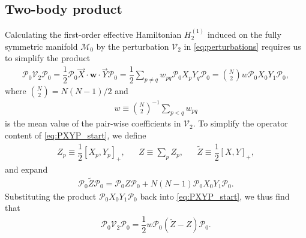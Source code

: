\documentclass[nofootinbib,notitlepage,11pt]{revtex4-2}
\newcommand{\f}[2]{\dfrac{#1}{#2}} %
\newcommand{\p}[1]{\left(#1\right)} %
\renewcommand{\sp}[1]{\left[#1\right]} %
\renewcommand{\c}{\cdot} %
\newcommand{\m}{\bm} %
\renewcommand{\v}{\vec} %
\newcommand{\1}{\mathds{1}}
\newcommand{\M}{\mathcal{M}}
\renewcommand{\P}{\mathcal{P}}
\newcommand{\V}{\mathcal{V}}
\begin{document}
\subsection{Two-body product}
\label{sec:PXYP}

Calculating the first-order effective Hamiltonian $H_2^{(1)}$ induced
on the fully symmetric manifold $\M_0$ by the perturbation $\V_2$ in
\eqref{eq:perturbations} requires us to simplify the product
\begin{align}
  \P_0 \V_2 \P_0
  = \f12 \P_0 \v X\c\m w\c\v Y\P_0
  = \f12 \sum_{p\ne q} w_{pq} \P_0 X_p Y_q \P_0
  = {N\choose 2} w \P_0 X_0 Y_1 \P_0,
  \label{eq:PXYP_start}
\end{align}
where ${N\choose2}=N\p{N-1}/2$ and
\begin{align}
  w \equiv {N\choose 2}^{-1} \sum_{p<q} w_{pq}
\end{align}
is the mean value of the pair-wise coefficients in $\V_2$.  To
simplify the operator content of \eqref{eq:PXYP_start}, we define
\begin{align}
  Z_p \equiv \f12\sp{X_p, Y_p}_+,
  &&
  Z \equiv \sum_p Z_p,
  &&
  \tilde Z \equiv \f12 \sp{X, Y}_+,
\end{align}
and expand
\begin{align}
  \P_0 \tilde Z \P_0 = \P_0 Z \P_0 + N\p{N-1} \P_0 X_0 Y_1 \P_0.
\end{align}
Substituting the product $\P_0 X_0 Y_1 \P_0$ back into
\eqref{eq:PXYP_start}, we thus find that
\begin{align}
  \P_0 \V_2 \P_0
  = \f12 w \P_0 \p{\tilde Z -  Z } \P_0.
\end{align}


\end{document}
